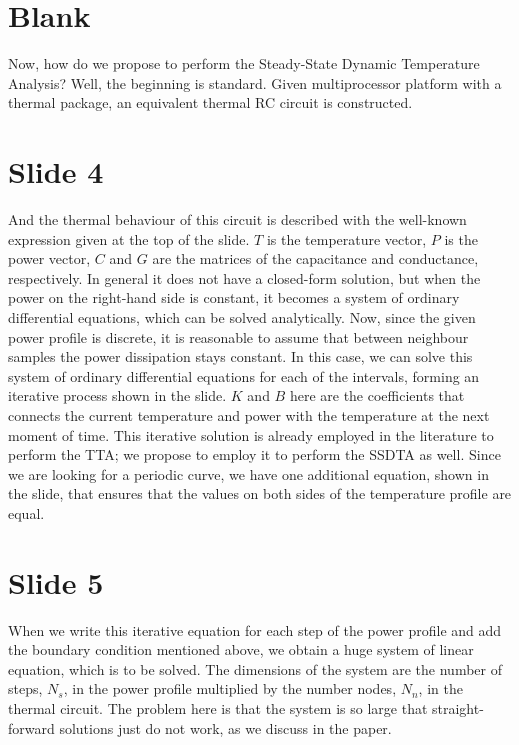 \documentclass[11pt,a4paper]{article}
\begin{document}
\section{Blank}
Now, how do we propose to perform the Steady-State Dynamic Temperature Analysis? Well, the beginning is standard. Given multiprocessor platform with a thermal package, an equivalent thermal RC circuit is constructed.

\section{Slide 4}
And the thermal behaviour of this circuit is described with the well-known expression given at the top of the slide. $T$ is the temperature vector, $P$ is the power vector, $C$ and $G$ are the matrices of the capacitance and conductance, respectively. In general it does not have a closed-form solution, but when the power on the right-hand side is constant, it becomes a system of ordinary differential equations, which can be solved analytically. Now, since the given power profile is discrete, it is reasonable to assume that between neighbour samples the power dissipation stays constant. In this case, we can solve this system of ordinary differential equations for each of the intervals, forming an iterative process shown in the slide. $K$ and $B$ here are the coefficients that connects the current temperature and power with the temperature at the next moment of time. This iterative solution is already employed in the literature to perform the TTA; we propose to employ it to perform the SSDTA as well. Since we are looking for a periodic curve, we have one additional equation, shown in the slide, that ensures that the values on both sides of the temperature profile are equal.

\section{Slide 5}
When we write this iterative equation for each step of the power profile and add the boundary condition mentioned above, we obtain a huge system of linear equation, which is to be solved. The dimensions of the system are the number of steps, $N_s$, in the power profile multiplied by the number nodes, $N_n$, in the thermal circuit. The problem here is that the system is so large that straight-forward solutions just do not work, as we discuss in the paper.
\end{document}
